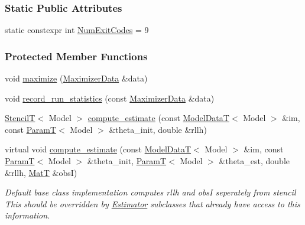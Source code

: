 \subsubsection*{Static Public Attributes}
\begin{DoxyCompactItemize}
\item 
static constexpr int \hyperlink{classmappel_1_1Estimator_afcec036c4d78c12d427e0a733a00a48e}{Num\+Exit\+Codes} = 9
\end{DoxyCompactItemize}
\subsubsection*{Protected Member Functions}
\begin{DoxyCompactItemize}
\item 
void \hyperlink{classmappel_1_1QuasiNewtonMaximizer_ab4d32d8ba90d4355262a228753619b9f}{maximize} (\hyperlink{classmappel_1_1QuasiNewtonMaximizer_a558d3c5e494648dcb756de6a2779402e}{Maximizer\+Data} \&data)
\item 
void \hyperlink{classmappel_1_1IterativeMaximizer_af5614c292f139b5032b733a8d6fdf73e}{record\+\_\+run\+\_\+statistics} (const \hyperlink{classmappel_1_1QuasiNewtonMaximizer_a558d3c5e494648dcb756de6a2779402e}{Maximizer\+Data} \&data)
\item 
\hyperlink{namespacemappel_a3a06598240007876f8c4bf834ad86197}{StencilT}$<$ Model $>$ \hyperlink{classmappel_1_1IterativeMaximizer_ad83f7b0a5b4d412f419b6089e73a66e0}{compute\+\_\+estimate} (const \hyperlink{namespacemappel_a97f050df953605381ae9c901c3b125f1}{Model\+DataT}$<$ Model $>$ \&im, const \hyperlink{namespacemappel_a667925cb0d6c0e49f2f035cc5a9a6857}{ParamT}$<$ Model $>$ \&theta\+\_\+init, double \&rllh)
\item 
virtual void \hyperlink{classmappel_1_1Estimator_aa46d86cfb5c336c9cb8c106da036d7d1}{compute\+\_\+estimate} (const \hyperlink{namespacemappel_a97f050df953605381ae9c901c3b125f1}{Model\+DataT}$<$ Model $>$ \&im, const \hyperlink{namespacemappel_a667925cb0d6c0e49f2f035cc5a9a6857}{ParamT}$<$ Model $>$ \&theta\+\_\+init, \hyperlink{namespacemappel_a667925cb0d6c0e49f2f035cc5a9a6857}{ParamT}$<$ Model $>$ \&theta\+\_\+est, double \&rllh, \hyperlink{namespacemappel_a7091ab87c528041f7e2027195fad8915}{MatT} \&obsI)
\begin{DoxyCompactList}\small\item\em Default base class implementation computes rllh and obsI seperately from stencil This should be overridden by \hyperlink{classmappel_1_1Estimator}{Estimator} subclasses that already have access to this information. \end{DoxyCompactList}\item 

\end{DoxyCompactItemize}
